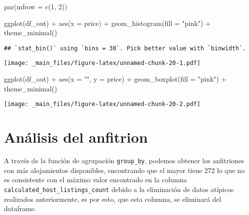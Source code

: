 \documentclass[
]{book}
\newenvironment{Shaded}{\begin{snugshade}}{\end{snugshade}}
\newcommand{\AttributeTok}[1]{\textcolor[rgb]{0.77,0.63,0.00}{#1}}
\newcommand{\DecValTok}[1]{\textcolor[rgb]{0.00,0.00,0.81}{#1}}
\newcommand{\FunctionTok}[1]{\textcolor[rgb]{0.00,0.00,0.00}{#1}}
\newcommand{\NormalTok}[1]{#1}
\newcommand{\SpecialCharTok}[1]{\textcolor[rgb]{0.00,0.00,0.00}{#1}}
\newcommand{\StringTok}[1]{\textcolor[rgb]{0.31,0.60,0.02}{#1}}
\begin{document}
\begin{Shaded}
\begin{Highlighting}[]
\FunctionTok{par}\NormalTok{(}\AttributeTok{mfrow =} \FunctionTok{c}\NormalTok{(}\DecValTok{1}\NormalTok{, }\DecValTok{2}\NormalTok{))}

\FunctionTok{ggplot}\NormalTok{(df\_out) }\SpecialCharTok{+}
  \FunctionTok{aes}\NormalTok{(}\AttributeTok{x =}\NormalTok{ price) }\SpecialCharTok{+}
  \FunctionTok{geom\_histogram}\NormalTok{(}\AttributeTok{fill =} \StringTok{"pink"}\NormalTok{) }\SpecialCharTok{+}
  \FunctionTok{theme\_minimal}\NormalTok{()}
\end{Highlighting}
\end{Shaded}

\begin{verbatim}
## `stat_bin()` using `bins = 30`. Pick better value with `binwidth`.
\end{verbatim}

\texttt{[image: \_main\_files/figure-latex/unnamed-chunk-20-1.pdf]}

\begin{Shaded}
\begin{Highlighting}[]
\FunctionTok{ggplot}\NormalTok{(df\_out) }\SpecialCharTok{+}
  \FunctionTok{aes}\NormalTok{(}\AttributeTok{x =} \StringTok{""}\NormalTok{, }\AttributeTok{y =}\NormalTok{ price) }\SpecialCharTok{+}
  \FunctionTok{geom\_boxplot}\NormalTok{(}\AttributeTok{fill =} \StringTok{"pink"}\NormalTok{) }\SpecialCharTok{+}
  \FunctionTok{theme\_minimal}\NormalTok{()}
\end{Highlighting}
\end{Shaded}

\texttt{[image: \_main\_files/figure-latex/unnamed-chunk-20-2.pdf]}

\hypertarget{anuxe1lisis-del-anfitrion}{%
\section*{Análisis del anfitrion}\label{anuxe1lisis-del-anfitrion}}

A través de la función de agrupación \texttt{group\_by}, podemos obtener los anfitriones con más alojamientos disponibles, encontrando que el mayor tiene 272 lo que no es consistente con el máximo valor encontrado en la columna \texttt{calculated\_host\_listings\_count} debido a la eliminación de datos atípicos realizados anteriormente, es por esto, que esta columna, se eliminará del dataframe.
\end{document}
